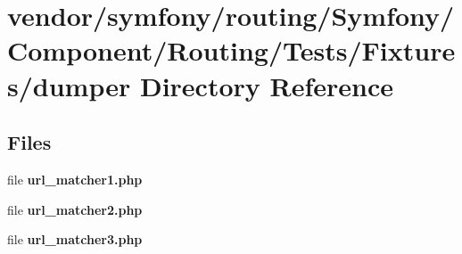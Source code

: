 \section{vendor/symfony/routing/\+Symfony/\+Component/\+Routing/\+Tests/\+Fixtures/dumper Directory Reference}
\label{dir_47eb60ff1f07333ece93c184e3d50eea}
\subsection*{Files}
\begin{DoxyCompactItemize}
\item 
file {\bf url\+\_\+matcher1.\+php}
\item 
file {\bf url\+\_\+matcher2.\+php}
\item 
file {\bf url\+\_\+matcher3.\+php}
\end{DoxyCompactItemize}
